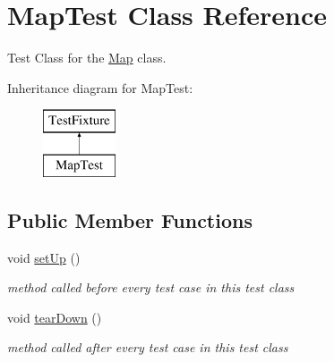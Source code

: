 \hypertarget{classMapTest}{}\section{Map\+Test Class Reference}
\label{classMapTest}


Test Class for the \hyperlink{classMap}{Map} class.  


Inheritance diagram for Map\+Test\+:\begin{figure}[H]
\begin{center}
\leavevmode
\includegraphics[height=2.000000cm]{classMapTest}
\end{center}
\end{figure}
\subsection*{Public Member Functions}
\begin{DoxyCompactItemize}
\item 
\hypertarget{classMapTest_a548501698e49e4de388482c502962cfd}{}\label{classMapTest_a548501698e49e4de388482c502962cfd} 
void \hyperlink{classMapTest_a548501698e49e4de388482c502962cfd}{set\+Up} ()
\begin{DoxyCompactList}\small\item\em method called before every test case in this test class \end{DoxyCompactList}\item 
\hypertarget{classMapTest_a1a75bd7462d39afc6f5039fa36252cca}{}\label{classMapTest_a1a75bd7462d39afc6f5039fa36252cca} 
void \hyperlink{classMapTest_a1a75bd7462d39afc6f5039fa36252cca}{tear\+Down} ()
\begin{DoxyCompactList}\small\item\em method called after every test case in this test class \end{DoxyCompactList}\end{DoxyCompactItemize}
